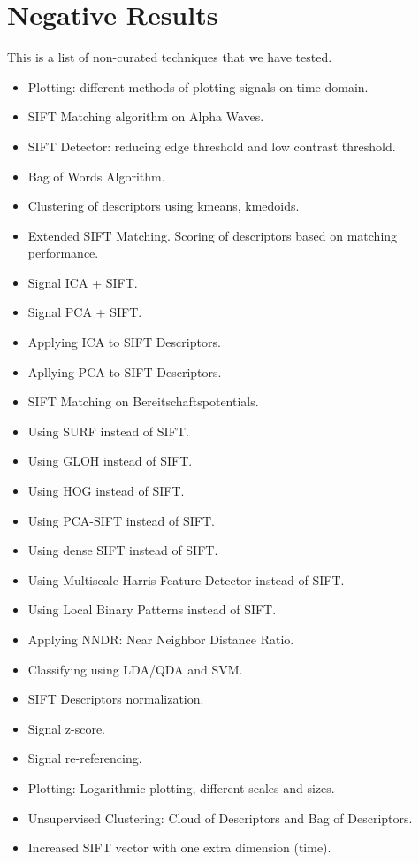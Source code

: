 \chapter{Negative Results}
\label{chapter:twelve}

This is a list of non-curated techniques that we have tested.

\begin{itemize}
\setlength\itemsep{-0.8em}
\item Plotting: different methods of plotting signals on time-domain.
\item SIFT Matching algorithm on Alpha Waves.
\item SIFT Detector: reducing edge threshold and low contrast threshold.
\item Bag of Words Algorithm.
\item Clustering of descriptors using kmeans, kmedoids.
\item Extended SIFT Matching.  Scoring of descriptors based on matching performance.
\item Signal ICA + SIFT.
\item Signal PCA + SIFT.
\item Applying ICA to SIFT Descriptors.
\item Apllying PCA to SIFT Descriptors.
\item SIFT Matching on Bereitschaftspotentials.
\item Using SURF instead of SIFT.
\item Using GLOH instead of SIFT.
\item Using HOG instead of SIFT.
\item Using PCA-SIFT instead of SIFT.
\item Using dense SIFT instead of SIFT.
\item Using Multiscale Harris Feature Detector instead of SIFT.
\item Using Local Binary Patterns instead of SIFT.
\item Applying NNDR: Near Neighbor Distance Ratio.
\item Classifying using  LDA/QDA and SVM.
\item SIFT Descriptors normalization.
\item Signal z-score.
\item Signal re-referencing.
\item Plotting: Logarithmic plotting, different scales and sizes.
\item Unsupervised Clustering: Cloud of Descriptors and Bag of Descriptors.
\item Increased SIFT vector with one extra dimension (time).

\end{itemize}
